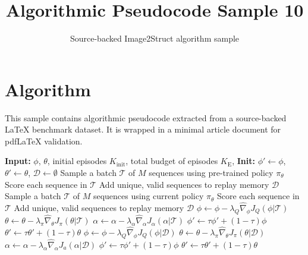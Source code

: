 \documentclass[11pt]{article}
\title{Algorithmic Pseudocode Sample 10}
\author{Source-backed Image2Struct algorithm sample}
\date{}
\begin{document}
\maketitle
\section{Algorithm}
This sample contains algorithmic pseudocode extracted from a source-backed LaTeX benchmark dataset. It is wrapped in a minimal article document for pdfLaTeX validation.

\begin{algorithm}[htbp]
\caption{Source-backed algorithmic procedure}
\begin{algorithm}
\caption{Discrete Soft Actor-Critic for \textit{de novo} drug design}\begin{algorithmic}[1]
\Statex \textbf{Input:} $\phi$, $\theta$, initial episodes $K_{\mathrm{init}}$, total budget of episodes $K_{\mathrm{E}}$,
\Statex \textbf{Init:} $\phi' \gets \phi$, $\theta' \gets \theta$, $\mathcal{D} \gets \emptyset$
\State Sample a batch $\mathcal{T}$ of $M$ sequences using pre-trained policy $\pi_\theta$
\State Score each sequence in $\mathcal{T}$
\State Add unique, valid sequences to replay memory $\mathcal{D}$
\EndFor
{}
\State Sample a batch $\mathcal{T}$ of $M$ sequences using current policy $\pi_\theta$
\State Score each sequence in $\mathcal{T}$
\State Add unique, valid sequences to replay memory $\mathcal{D}$
\State $\phi \gets \phi - \lambda_Q \hat{\nabla}_\phi J_Q (\phi \vert \mathcal{T})$ 
\State $\theta \gets \theta - \lambda_\pi \hat{\nabla}_\theta J_\pi (\theta\vert \mathcal{T})$ 
\State $\alpha \gets \alpha - \lambda_\alpha \hat{\nabla}_\alpha J_\alpha (\alpha \vert \mathcal{T})$ 
\State $\phi' \gets \tau \phi' + (1-\tau) \phi$ 
\State $\theta' \gets \tau \theta' + (1-\tau) \theta$ 
\State $\phi \gets \phi - \lambda_Q \hat{\nabla}_\phi J_Q (\phi \vert \mathcal{D})$
\State $\theta \gets \theta - \lambda_\pi \hat{\nabla}_\theta J_\pi (\theta\vert \mathcal{D})$
\State $\alpha \gets \alpha - \lambda_\alpha \hat{\nabla}_\alpha J_a (\alpha \vert \mathcal{D})$
\State $\phi' \gets \tau \phi' + (1-\tau) \phi$
\State $\theta' \gets \tau \theta' + (1-\tau) \theta$
\EndFor
\EndFor
\end{algorithmic}
\end{algorithm}
\end{algorithm}
\end{document}
